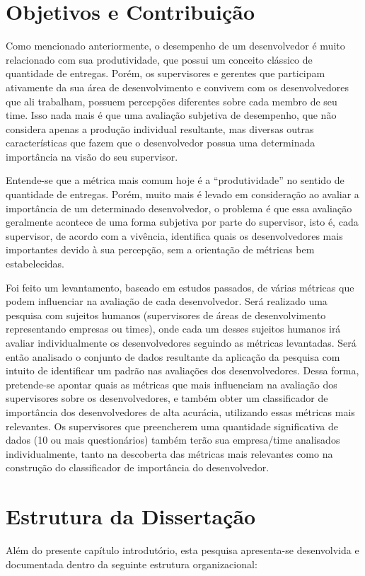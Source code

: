 \section{Objetivos e Contribuição}
Como mencionado anteriormente, o desempenho de um desenvolvedor é muito relacionado com sua produtividade, que possui um conceito clássico de quantidade de entregas. Porém, os supervisores e gerentes que participam ativamente da sua área de desenvolvimento e convivem com os desenvolvedores que ali trabalham, possuem percepções diferentes sobre cada membro de seu time. Isso nada mais é que uma avaliação subjetiva de desempenho, que não considera apenas a produção individual resultante, mas diversas outras características que fazem que o desenvolvedor possua uma determinada importância na visão do seu supervisor.

Entende-se que a métrica mais comum hoje é a “produtividade” no sentido de quantidade de entregas. Porém, muito mais é levado em consideração ao avaliar a importância de um determinado desenvolvedor, o problema é que essa avaliação geralmente acontece de uma forma subjetiva por parte do supervisor, isto é, cada supervisor, de acordo com a vivência, identifica quais os desenvolvedores mais importantes devido à sua percepção, sem a orientação de métricas bem estabelecidas.

Foi feito um levantamento, baseado em estudos passados, de várias métricas que podem influenciar na avaliação de cada desenvolvedor. Será realizado uma pesquisa com sujeitos humanos (supervisores de áreas de desenvolvimento representando empresas ou times), onde cada um desses sujeitos humanos irá avaliar individualmente os desenvolvedores seguindo as métricas levantadas. Será então analisado o conjunto de dados resultante da aplicação da pesquisa com intuito de identificar um padrão nas avaliações dos desenvolvedores. Dessa forma, pretende-se apontar quais as métricas que mais influenciam na avaliação dos supervisores sobre os desenvolvedores, e também obter um classificador de importância dos desenvolvedores de alta acurácia, utilizando essas métricas mais relevantes. Os supervisores que preencherem uma quantidade significativa de dados (10 ou mais questionários) também terão sua empresa/time analisados individualmente, tanto na descoberta das métricas mais relevantes como na construção do classificador de importância do desenvolvedor.


\section{Estrutura da Dissertação}
Além do presente capítulo introdutório, esta pesquisa apresenta-se desenvolvida e documentada dentro da seguinte estrutura organizacional:

